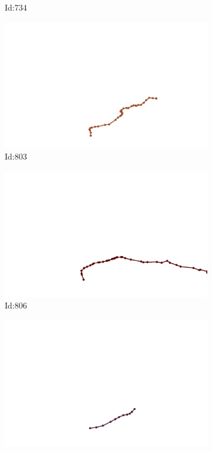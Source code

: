 \documentclass[12pt,twoside]{report}
\begin{document}
\begin{figure}
\begin{subfigure}[b]{0.20\textwidth}
\caption{Id:734}
\end{subfigure}
\begin{subfigure}[b]{0.20\textwidth}
\centering
\includegraphics[width=\textwidth]{../trajectories/803.png}
\caption{Id:803}
\end{subfigure}
\begin{subfigure}[b]{0.20\textwidth}
\centering
\includegraphics[width=\textwidth]{../trajectories/806.png}
\caption{Id:806}
\end{subfigure}
\begin{subfigure}[b]{0.20\textwidth}
\centering
\includegraphics[width=\textwidth]{../trajectories/823.png}

\end{subfigure}
\end{figure}
\end{document}
